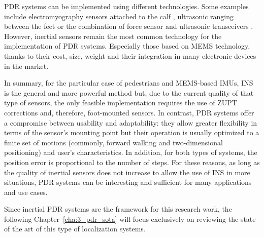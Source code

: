 PDR systems can be implemented using different technologies. Some examples include electromyography sensors attached to the calf \cite{wang_novel_2010}, ultrasonic ranging between the feet \cite{saarinen_personal_2004} or the combination of force sensor and ultrasonic transceivers \cite{yeh_geta_2007}.
However, inertial sensors remain the most common technology for the implementation of PDR systems. 
Especially those based on MEMS technology, thanks to their cost, size, weight and their integration in many electronic devices in the market.


In summary, for the particular case of pedestrians and MEMS-based IMUs, INS is the general and more powerful method but, due to the current quality of that type of sensors, the only feasible implementation requires the use of ZUPT corrections and, therefore, foot-mounted sensors.
In contrast, PDR systems offer a compromise between usability and adaptability: they allow greater flexibility in terms of the sensor's mounting point but their operation is usually optimized to a finite set of motions (commonly, forward walking and two-dimensional positioning) and user's characteristics.
In addition, for both types of systems, the position error is proportional to the number of steps.
For these reasons, as long as the quality of inertial sensors does not increase to allow the use of INS in more situations, PDR systems can be interesting and sufficient for many applications and use cases.

Since inertial PDR systems are the framework for this research work, the following Chapter~\ref{cha:3_pdr_sota} will focus exclusively on reviewing the state of the art of this type of localization systems.